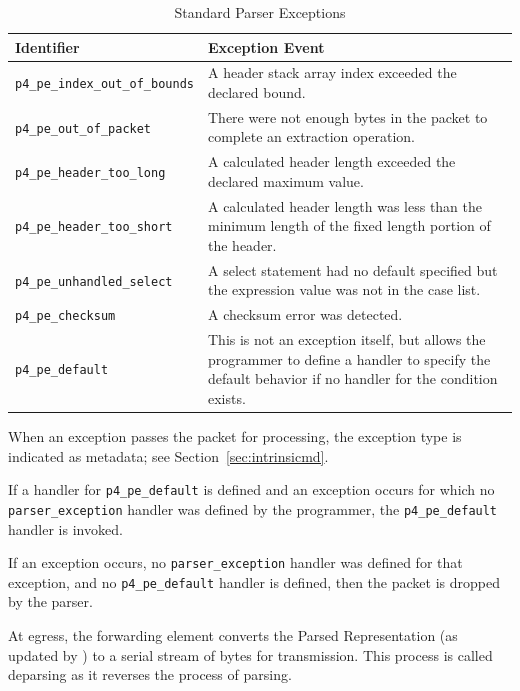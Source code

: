 \documentclass[12pt]{article}
\begin{document}
\begin{table}[H]
\begin{center}
\begin{tabular}{| l | p{} |} \hline
\textbf{Identifier} &
\textbf{Exception Event} \\ \hline
\texttt{p4_pe_index_out_of_bounds} &
A header stack array index exceeded the declared bound. \\ \hline
\texttt{p4_pe_out_of_packet} &
There were not enough bytes in the packet to complete an extraction operation. \\ \hline
\texttt{p4_pe_header_too_long} &
A calculated header length exceeded the declared maximum value. \\ \hline
\texttt{p4_pe_header_too_short} &
A calculated header length was less than the minimum length of the fixed length
portion of the header. \\ \hline
\texttt{p4_pe_unhandled_select} &
A select statement had no default specified but the expression value was not
in the case list. \\ \hline
\texttt{p4_pe_checksum} &
A checksum error was detected. \\ \hline
\texttt{p4_pe_default} &
This is not an exception itself, but allows the programmer to define a handler
to specify the default behavior if no handler for the condition exists. \\
\hline
\end{tabular}
\end{center}
\caption{Standard Parser Exceptions}
\label{tab:parserexceptions}
\end{table}

When an exception passes the packet for \matchaction processing, the exception
type is indicated as metadata; see Section~\ref{sec:intrinsicmd}.


If a handler for \texttt{p4_pe_default} is defined and an exception occurs for which
no \\
\texttt{parser_exception} handler was defined by the programmer, the \texttt{p4_pe_default} handler
is invoked.

If an exception occurs, no \texttt{parser_exception} handler was defined for that
exception, and no \texttt{p4_pe_default} handler is defined, then the packet is
dropped by the parser.


At egress, the forwarding element converts the Parsed Representation (as updated
by \matchaction) to a serial stream of bytes for transmission. This process
is called deparsing as it reverses the process of parsing.
\end{document}

